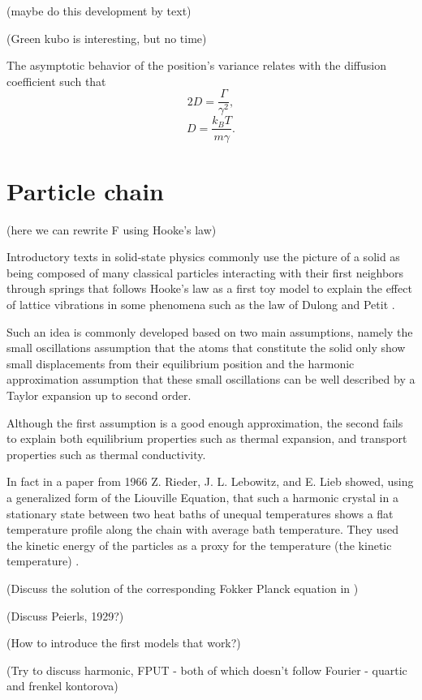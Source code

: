 (maybe do this development by text)

(Green kubo is interesting, but no time)

The asymptotic behavior of the position's variance relates with the diffusion coefficient such that
$$ 2D = \frac{\Gamma}{\gamma^2}, $$
$$ D = \frac{k_{B}T}{m\gamma}. $$

\section{Particle chain}

(here we can rewrite F using Hooke's law)

Introductory texts in solid-state physics commonly use the picture of a solid as being composed of many classical particles interacting with their first neighbors through springs that follows Hooke's law as a first toy model to explain the effect of lattice vibrations in some phenomena such as the law of Dulong and Petit \cite{ashcroftSolidState1976}.

Such an idea is commonly developed based on two main assumptions, namely the small oscillations assumption that the atoms that constitute the solid only show small displacements from their equilibrium position and the harmonic approximation assumption that these small oscillations can be well described by a Taylor expansion up to second order.

Although the first assumption is a good enough approximation, the second fails to explain both equilibrium properties such as thermal expansion, and transport properties such as thermal conductivity.

In fact in a paper from 1966 Z. Rieder, J. L. Lebowitz, and E. Lieb showed, using a generalized form of the Liouville Equation, that such a harmonic crystal in a stationary state between two heat baths of unequal temperatures shows a flat temperature profile along the chain with average bath temperature. They used the kinetic energy of the particles as a proxy for the temperature (the kinetic temperature) \cite{riederPropertiesHarmonic1967}.

(Discuss the solution of the corresponding Fokker Planck equation in \cite{lepriThermalConduction2003})

(Discuss Peierls, 1929?)

(How to introduce the first models that work?)

(Try to discuss harmonic, FPUT - both of which doesn't follow Fourier - quartic and frenkel kontorova)


